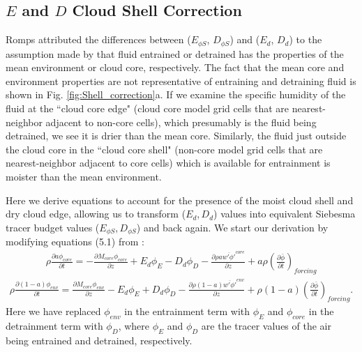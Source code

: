 \documentclass[12pt]{article}
\begin{document}

\subsection{$E$ and $D$ Cloud Shell Correction}

Romps attributed the differences between ($E_{\phi S}$, $D_{\phi S}$)
and ($E_d$, $D_d$) to the assumption made by \cite{Siebesma1995} that
fluid entrained or detrained has the properties of the mean
environment or cloud core, respectively.  The fact that the mean core
and environment properties are not representative of entraining and
detraining fluid is shown in Fig. \ref{fig:Shell_correction}a. If we
examine the specific humidity of the fluid at the ``cloud core edge"
(cloud core model grid cells that are nearest-neighbor adjacent to
non-core cells), which presumably is the fluid being detrained, we see
it is drier than the mean core.  Similarly, the fluid just outside the
cloud core in the ``cloud core shell" (non-core model grid cells that
are nearest-neighbor adjacent to core cells) which is available for
entrainment is moister than the mean environment.

Here we derive equations to account for the presence of the moist cloud shell 
and dry cloud edge, allowing us to transform ($E_d, D_d$) values into 
equivalent Siebesma tracer budget values ($E_{\phi S}, D_{\phi S}$) and back
again.  We start our derivation by modifying equations (5.1) from
\cite{Siebesma1995}:
\begin{eqnarray}
  \label{eq:entrainment_derivation_1}
    \rho \frac{\partial a \phi_{core}}{\partial t} 
    = - \frac{\partial M_{core} \phi_{core}}{\partial z} 
    + E_d \phi_E - D_d \phi_D
    - \frac{\partial \rho a \overline{w' \phi'}^{core}}{\partial z} 
    + a \rho \left(\frac{\partial \bar{\phi}}{\partial t}\right)_{forcing}
\end{eqnarray}
\begin{eqnarray}
  \label{eq:detrainment_derivation_1}
    \rho \frac{\partial (1 - a) \phi_{env}}{\partial t}
    = \frac{\partial M_{core} \phi_{env}}{\partial z} 
    - E_d \phi_E + D_d \phi_D
    - \frac{\partial \rho (1 - a) \overline{w' \phi'}^{env}}{\partial z} 
    + \rho (1 - a) \left(\frac{\partial \bar{\phi}}{\partial t}\right)_{forcing}.
\end{eqnarray}
Here we have replaced $\phi_{env}$ in the entrainment term with $\phi_E$ and 
$\phi_{core}$ in the detrainment term with $\phi_D$, where $\phi_E$ and $\phi_D$
are the tracer values of the air being entrained and detrained, respectively.
\end{document}
